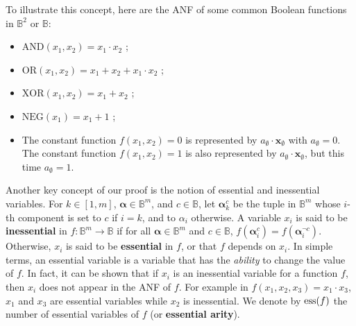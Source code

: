 \begin{testexample}
To illustrate this concept, here are
the ANF of some common Boolean functions in $\mathbb{B}^2$ or $\mathbb{B}$:

\begin{itemize}
  \item $\text{AND}(x_1, x_2) = x_1 \cdot x_2$ ;
  \item $\text{OR}(x_1, x_2) = x_1 + x_2 + x_1 \cdot x_2$ ;
  \item $\text{XOR}(x_1, x_2) = x_1 + x_2$ ;
  \item $\text{NEG}(x_1) = x_1 + 1$ ;
  \item The constant function $f(x_1, x_2) = 0$ is represented by
    $a_\emptyset\cdot \mathbf{x}_\emptyset$ with $a_\emptyset =0$. The constant
    function $f(x_1, x_2) = 1$ is also represented by $a_\emptyset\cdot
    \mathbf{x}_\emptyset$, but this time $a_\emptyset =1$.
\end{itemize}
\end{testexample}

Another key concept of our proof is the notion of essential and inessential
variables.  For $k\in [1,m]$, $\boldsymbol{\alpha}\in \mathbb{B}^m$, and $c \in
\mathbb{B}$, let ${\boldsymbol{\alpha}}_{k}^c$ be the tuple in $\mathbb{B}^{m}$
whose $i$-th component is set to $c$ if $i=k$, and to $\alpha_i$ otherwise.  A
variable $x_i$ is said to be \textbf{inessential} in $f\colon \mathbb{B}^m\to
\mathbb{B}$ if for all $\boldsymbol{\alpha} \in \mathbb{B}^m$ and $c \in
\mathbb{B}$, $f(\boldsymbol{\alpha}^c_i) = f(\boldsymbol{\alpha}^{\neg c}_i)$.
Otherwise, $x_i$ is said to be \textbf{essential} in $f$, or that $f$ depends
on $x_i$. In simple terms, an essential variable is a variable that has the
\textit{ability} to change the value of $f$. In fact, it can be shown that if
$x_i$ is an inessential variable for a function $f$, then $x_i$ does not appear
in the ANF of $f$.  For example in $f(x_1, x_2, x_3) = x_1 \cdot x_3$, $x_1$
and $x_3$ are essential variables while $x_2$ is inessential.  We denote by
$\operatorname{ess}(f)$ the number of essential variables of $f$ (or \textbf{essential
arity}).

